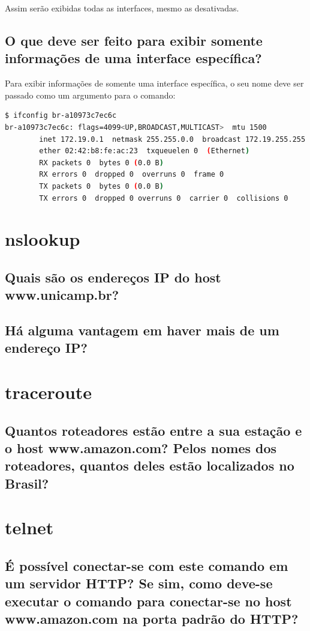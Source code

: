 \documentclass[12pt,a4paper]{report}
\begin{document}
\noindent Assim serão exibidas todas as interfaces, mesmo as desativadas.

\subsection{O que deve ser feito para exibir somente informações de uma interface específica?}

Para exibir informações de somente uma interface específica, o seu nome deve ser passado como um argumento para o comando:

\begin{lstlisting}[language=bash]
$ ifconfig br-a10973c7ec6c
br-a10973c7ec6c: flags=4099<UP,BROADCAST,MULTICAST>  mtu 1500
        inet 172.19.0.1  netmask 255.255.0.0  broadcast 172.19.255.255
        ether 02:42:b8:fe:ac:23  txqueuelen 0  (Ethernet)
        RX packets 0  bytes 0 (0.0 B)
        RX errors 0  dropped 0  overruns 0  frame 0
        TX packets 0  bytes 0 (0.0 B)
        TX errors 0  dropped 0 overruns 0  carrier 0  collisions 0
\end{lstlisting}

\section{nslookup}
\subsection{Quais são os endereços IP do host www.unicamp.br?}
\subsection{Há alguma vantagem em haver mais de um endereço IP?}

\section{traceroute}
\subsection{Quantos roteadores estão entre a sua estação e o host www.amazon.com? Pelos nomes dos roteadores, quantos deles estão localizados no Brasil?}

\section{telnet}
\subsection{É possível conectar-se com este comando em um servidor HTTP? Se sim, como deve-se executar o comando para conectar-se no host www.amazon.com na porta padrão do HTTP?}
\end{document}
